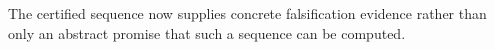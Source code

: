 The certified sequence now supplies concrete falsification evidence rather than only an abstract promise that such a sequence can be computed.
